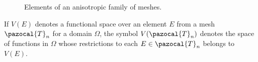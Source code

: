 \begin{figure}[!h]\centering
  \subfloat
  {
    \hspace{1cm}
    \hspace{1cm}
    \hspace{1cm}
  }
  \caption{Elements of an anisotropic family of meshes.}
  \label{auxlabel12}
\end{figure}
\begin{defi}
  If $V(E)$ denotes a functional space over an element $E$ from a 
  mesh $\pazocal{T}_n$ for a domain $\Omega$, the symbol $V(\pazocal{T}_n)$
  denotes the space of functions in $\Omega$ whose restrictions to each 
  $E\in\pazocal{T}_n$ belongs to $V(E)$.
\end{defi}
